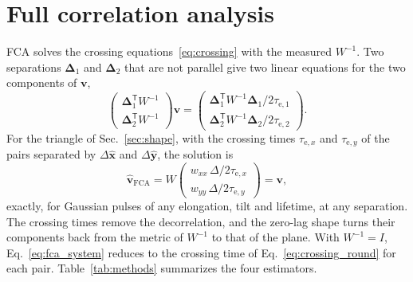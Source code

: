 \documentclass[aps,pre,11pt,a4paper,preprint,amsmath,amssymb,groupedaddress]{revtex4-2}
\newcommand{\Eqref}[1]{Eq.~\eqref{#1}}
\newcommand{\Tabref}[1]{Table~\ref{#1}}
\newcommand{\Secref}[1]{Sec.~\ref{#1}}
\newcommand{\wh}{\widehat}
\newcommand{\bv}{\ensuremath{\bm{v}}}
\newcommand{\bD}{\ensuremath{\bm{\Delta}}}
\newcommand{\bex}{\ensuremath{\hat{\bm{x}}}}
\newcommand{\bey}{\ensuremath{\hat{\bm{y}}}}
\newcommand{\T}{\ensuremath{\mathsf{T}}}
\newcommand{\Wi}{\ensuremath{W^{-1}}}
\newcommand{\w}[1]{\ensuremath{w_{#1}}}
\begin{document}
\section{Full correlation analysis}
\label{sec:fca}

FCA solves the crossing equations~\eqref{eq:crossing} with the measured \Wi. Two separations $\bD_1$ and $\bD_2$ that are not parallel give two linear equations for the two components of \bv,
%
\begin{equation}
\label{eq:fca_system}
\begin{pmatrix} \bD_1^\T\Wi \\ \bD_2^\T\Wi \end{pmatrix} \bv
=
\begin{pmatrix} \bD_1^\T\Wi\bD_1 / 2\tau_{\text{e},1} \\ \bD_2^\T\Wi\bD_2 / 2\tau_{\text{e},2} \end{pmatrix}.
\end{equation}
%
For the triangle of \Secref{sec:shape}, with the crossing times $\tau_{\text{e},x}$ and $\tau_{\text{e},y}$ of the pairs separated by $\Delta\bex$ and $\Delta\bey$, the solution is
%
\begin{equation}
\label{eq:fca}
\wh{\bv}_\text{FCA} = W \begin{pmatrix} \w{xx}\, \Delta/2\tau_{\text{e},x} \\ \w{yy}\, \Delta/2\tau_{\text{e},y} \end{pmatrix} = \bv,
\end{equation}
%
exactly, for Gaussian pulses of any elongation, tilt and lifetime, at any separation. The crossing times remove the decorrelation, and the zero-lag shape turns their components back from the metric of \Wi{} to that of the plane. With $\Wi = I$, \Eqref{eq:fca_system} reduces to the crossing time of \Eqref{eq:crossing_round} for each pair. \Tabref{tab:methods} summarizes the four estimators.
\end{document}

